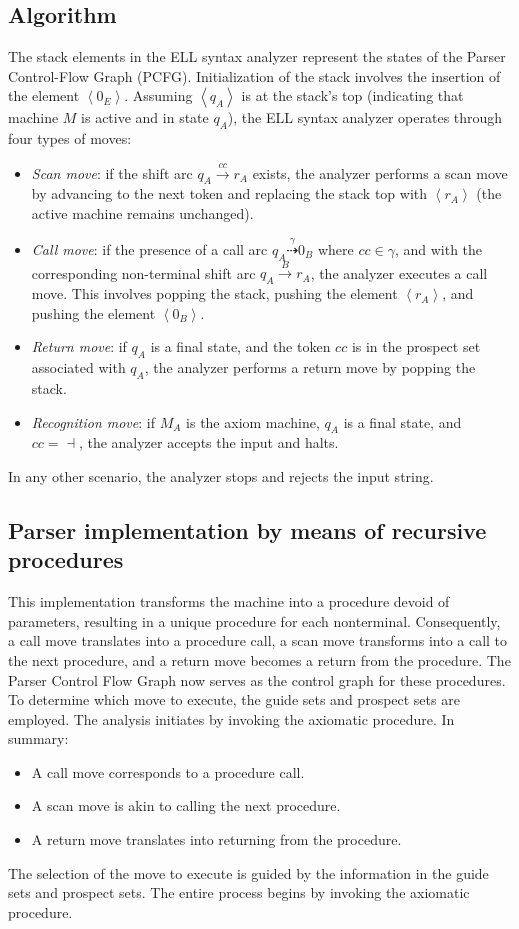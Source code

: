 \subsection{Algorithm}
The stack elements in the ELL syntax analyzer represent the states of the Parser Control-Flow Graph (PCFG).
Initialization of the stack involves the insertion of the element $\left\langle 0_E \right\rangle$. 
Assuming $\left\langle q_A \right\rangle$ is at the stack's top (indicating that machine $M$ is active and in state $q_A$), the ELL syntax analyzer operates through four types of moves:
\begin{itemize}
    \item \textit{Scan move}: if the shift arc $q_A \overset{cc}{\rightarrow}r_A$ exists, the analyzer performs a scan move by advancing to the next token and replacing the stack top with $\left\langle r_A \right\rangle$ (the active machine remains unchanged).
    \item \textit{Call move}: if the presence of a call arc $q_A \overset{\gamma}{\dashrightarrow} 0_B$ where  $cc \in \gamma$, and with the corresponding non-terminal shift arc $q_A \overset{B}{\rightarrow}r_A$, the analyzer executes a call move. 
        This involves popping the stack, pushing the element $\left\langle r_A \right\rangle$, and pushing the element $\left\langle 0_B \right\rangle$.
    \item \textit{Return move}: if $q_A$ is a final state, and the token $cc$ is in the prospect set associated with $q_A$, the analyzer performs a return move by popping the stack.
    \item \textit{Recognition move}: if $M_A$ is the axiom machine, $q_A$ is a final state, and $cc =\dashv$, the analyzer accepts the input and halts.
\end{itemize}
In any other scenario, the analyzer stops and rejects the input string.

\subsection{Parser implementation by means of recursive procedures}
This implementation transforms the machine into a procedure devoid of parameters, resulting in a unique procedure for each nonterminal. 
Consequently, a call move translates into a procedure call, a scan move transforms into a call to the next procedure, and a return move becomes a return from the procedure. 
The Parser Control Flow Graph now serves as the control graph for these procedures.
To determine which move to execute, the guide sets and prospect sets are employed. 
The analysis initiates by invoking the axiomatic procedure. 
In summary:
\begin{itemize}
    \item A call move corresponds to a procedure call.
    \item A scan move is akin to calling the next procedure.
    \item A return move translates into returning from the procedure.
\end{itemize} 
The selection of the move to execute is guided by the information in the guide sets and prospect sets. 
The entire process begins by invoking the axiomatic procedure.

